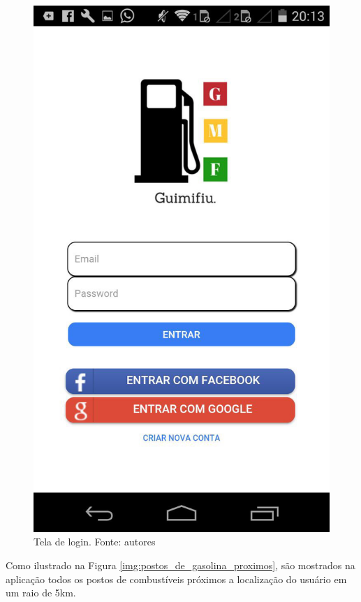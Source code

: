 \begin{figure}[H]
    \centering
    \includegraphics[scale=0.3]{figuras/app_1.jpg}
    \caption[Tela de login]{Tela de login. Fonte: autores}
    \label{img:tela_de_login}
\end{figure}

Como ilustrado na Figura \ref{img:postos_de_gasolina_proximos}, são mostrados na aplicação todos os postos de combustíveis próximos a localização do usuário em um raio de 5km.


